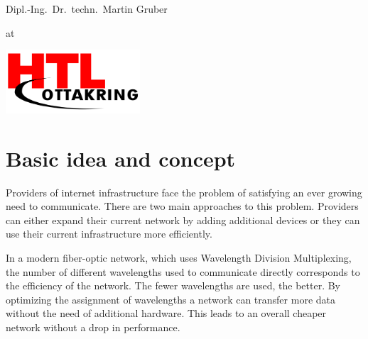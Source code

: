 \documentclass[paper=a4,fontsize=12pt]{scrartcl}
\begin{document}
\begin{titlepage}
\begin{center}
\vspace{5mm}

{\large Dipl.-Ing.\ Dr.\ techn.\ Martin Gruber}

\vspace{5mm}

at

\vspace{5mm}

\includegraphics[width=5cm]{../img/htl.png}

\vspace*{\fill}
\end{center}
\end{titlepage}
\tableofcontents
\newpage

\section{Basic idea and concept}

Providers of internet infrastructure face the problem of satisfying an ever growing need to communicate. There are two main approaches to this problem. Providers can either expand their current network by adding additional devices or they can use their current infrastructure more efficiently.


In a modern fiber-optic network, which uses Wavelength Division Multiplexing, the number of different wavelengths used to communicate directly corresponds to the efficiency of the network. The fewer wavelengths are used, the better. By optimizing the assignment of wavelengths a network can transfer more data without the need of additional hardware. This leads to an overall cheaper network without a drop in performance.
\end{document}
